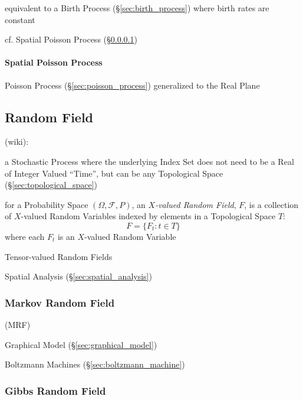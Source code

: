 equivalent to a Birth Process (\S\ref{sec:birth_process}) where birth rates are
constant

cf. Spatial Poisson Process (\S\ref{sec:spatial_poisson})



\paragraph{Spatial Poisson Process}\label{sec:spatial_poisson}\hfill

Poisson Process (\S\ref{sec:poisson_process}) generalized to the Real Plane



\subsection{Random Field}\label{sec:random_field}

(wiki):

a Stochastic Process where the underlying Index Set does not need to be a Real
of Integer Valued ``Time'', but can be any Topological Space
(\S\ref{sec:topological_space})

for a Probability Space $(\Omega, \mathcal{F}, P)$, an \emph{$X$-valued
  Random Field}, $F$, is a collection of $X$-valued Random Variables indexed by
elements in a Topological Space $T$:
\[
  F = \{ F_t : t \in T \}
\]
where each $F_t$ is an $X$-valued Random Variable

Tensor-valued Random Fields

\fist Spatial Analysis (\S\ref{sec:spatial_analysis})



\subsubsection{Markov Random Field}\label{sec:markov_random_field}

(MRF)

Graphical Model (\S\ref{sec:graphical_model})

Boltzmann Machines (\S\ref{sec:boltzmann_machine})



\subsubsection{Gibbs Random Field}\label{sec:gibbs_random_field}

